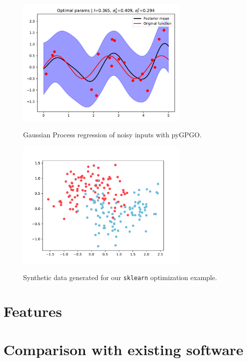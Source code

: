 \documentclass[10pt,a4paper,twoside]{book}
\begin{document}
\FloatBarrier
\begin{figure}
\centering
\caption{Gaussian Process regression of noisy inputs with pyGPGO.}
\includegraphics[width=0.75\textwidth]{figures/chapter5/noiseopt}
\label{fig:noiseopt}
\end{figure}

\begin{figure}
\centering
\caption{Synthetic data generated for our \texttt{sklearn} optimization example.}
\includegraphics[width=0.75\textwidth]{figures/chapter5/makemoons}
\label{fig:makemoons}
\end{figure}




\section{Features}\label{features}
\section{Comparison with existing software}
\end{document}
